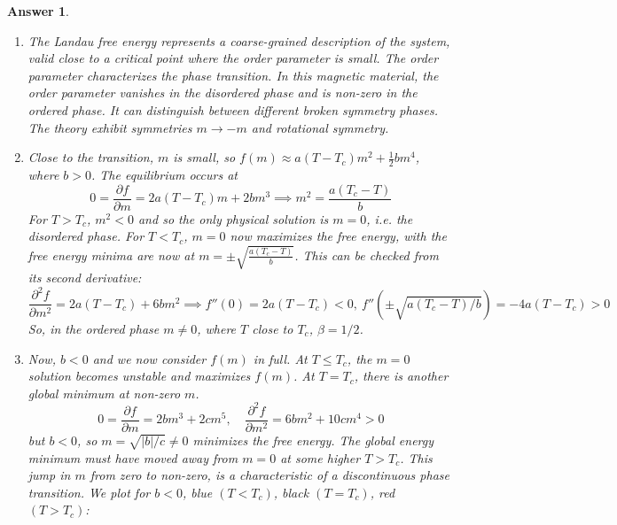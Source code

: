 \documentclass[a4paper]{article}
\newtheorem{ans}{Answer}[section]
\theoremstyle{new}
\begin{document}
\begin{ans}\leavevmode
\begin{enumerate}[label=(\alph*)]
\item The Landau free energy represents a coarse-grained description of the system, valid close to a critical point where the order parameter is small. The order parameter characterizes the phase transition. In this magnetic material, the order parameter vanishes in the disordered phase and is non-zero in the ordered phase. It can distinguish between different broken symmetry phases. The theory exhibit symmetries $m\rightarrow -m$ and rotational symmetry.
\item Close to the transition, $m$ is small, so $f(m)\approx a(T-T_c)m^2+\frac{1}{2}bm^4$, where $b>0$. The equilibrium occurs at 
$$0=\frac{\partial f}{\partial m}=2a(T-T_c)m+2bm^3\implies m^2=\frac{a(T_c-T)}{b}$$
For $T>T_c$, $m^2<0$ and so the only physical solution is $m=0$, i.e. the disordered phase. For $T<T_c$, $m=0$ now maximizes the free energy, with the free energy minima are now at $m=\pm\sqrt{\frac{a(T_c-T)}{b}}$. This can be checked from its second derivative:
$$\frac{\partial^2f}{\partial m^2}=2a(T-T_c)+6bm^2\implies f''(0)=2a(T-T_c)<0,~f''(\pm\sqrt{a(T_c-T)/b})=-4a(T-T_c)>0$$
So, in the ordered phase $m\neq 0$, where $T$ close to $T_c$, $\beta=1/2$.
\item Now, $b<0$ and we now consider $f(m)$ in full. At $T\leq T_c$, the $m=0$ solution becomes unstable and maximizes $f(m)$. At $T=T_c$, there is another global minimum at non-zero $m$.
$$0=\frac{\partial f}{\partial m}=2bm^3+2cm^5,\quad\frac{\partial^2f}{\partial m^2}=6bm^2+10 cm^4>0$$
but $b<0$, so $m=\sqrt{|b|/c}\neq 0$ minimizes the free energy. The global energy minimum must have moved away from $m=0$ at some higher $T>T_c$. This jump in $m$ from zero to non-zero, is a characteristic of a discontinuous phase transition. We plot for $b<0$, blue $(T<T_c)$, black $(T=T_c)$, red $(T>T_c)$:
\begin{center}

\end{center}
\end{enumerate}
\end{ans}
\end{document}
